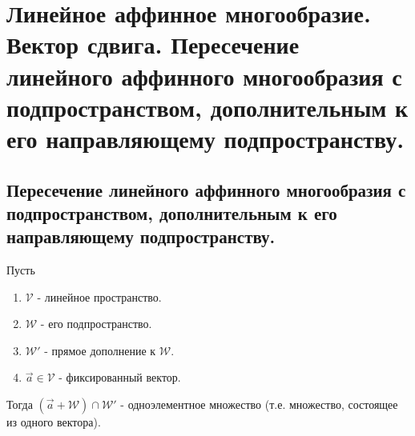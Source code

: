 \section{
    Линейное аффинное многообразие. Вектор сдвига. Пересечение линейного аффинного многообразия с подпространством, дополнительным к его направляющему подпространству.
}

\subsection{
    Пересечение линейного аффинного многообразия с подпространством, дополнительным к его направляющему подпространству.
}

\begin{theorem}
    Пусть
    \begin{enumerate}
        \item $\mathcal{V}$ - линейное пространство.
        \item $\mathcal{W}$ - его подпространство.
        \item $\mathcal{W'}$ - прямое дополнение к $\mathcal{W}$.
        \item $\vec{a} \in \mathcal{V}$ - фиксированный вектор.
    \end{enumerate}
    Тогда $(\vec{a} + \mathcal{W}) \cap \mathcal{W}'$ - одноэлементное множество (т.е. множество, состоящее из одного вектора).
\end{theorem}

